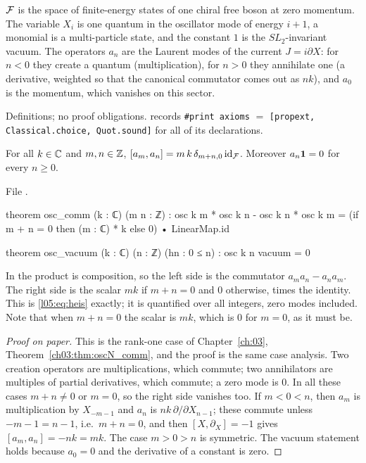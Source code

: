 \begin{physics}
$\mathcal{F}$ is the space of finite-energy states of one chiral free boson at zero momentum. The variable
$X_i$ is one quantum in the oscillator mode of energy $i+1$, a monomial is a multi-particle state, and the
constant $1$ is the $SL_2$-invariant vacuum. The operators $a_n$ are the Laurent modes of the current
$J=i\partial X$: for $n<0$ they create a quantum (multiplication), for $n>0$ they annihilate one (a
derivative, weighted so that the canonical commutator comes out as $nk$), and $a_0$ is the momentum, which
vanishes on this sector.
\end{physics}

\begin{status}
Definitions; no proof obligations.  records
\texttt{\#print axioms} $=$ \texttt{[propext, Classical.choice, Quot.sound]} for all of its declarations.
\end{status}

\begin{theorem}\label{l05:thm:osccomm}
For all $k\in{\mathbb{C}}$ and $m,n\in{\mathbb{Z}}$, $[a_m,a_n]=m\,k\,\delta_{m+n,0}\,\mathrm{id}_{\mathcal{F}}$. Moreover
$a_n\mathbf{1}=0$ for every $n\ge0$.
\end{theorem}

\noindent File .
\begin{leancode}
theorem osc_comm (k : ℂ) (m n : ℤ) :
    osc k m * osc k n - osc k n * osc k m
      = (if m + n = 0 then (m : ℂ) * k else 0) • LinearMap.id

theorem osc_vacuum (k : ℂ) (n : ℤ) (hn : 0 ≤ n) : osc k n vacuum = 0
\end{leancode}

\begin{dictionary}
In  the product \lean{*} is composition, so the left side is the commutator
$a_ma_n-a_na_m$. The right side is the scalar $mk$ if $m+n=0$ and $0$ otherwise, times the identity. This
is \eqref{l05:eq:heis} exactly; it is quantified over all integers, zero modes included. Note that when
$m+n=0$ the scalar is $mk$, which is $0$ for $m=0$, as it must be.
\end{dictionary}

\begin{proof}[Proof on paper]
This is the rank-one case of Chapter~\ref{ch:03}, Theorem~\ref{ch03:thm:oscN_comm}, and the proof is the same
case analysis. Two creation operators are multiplications, which commute; two annihilators are
multiples of partial derivatives, which commute; a zero mode is $0$. In all these cases $m+n\ne0$ or
$m=0$, so the right side vanishes too. If $m<0<n$, then $a_m$ is multiplication by $X_{-m-1}$ and $a_n$ is
$nk\,\partial/\partial X_{n-1}$; these commute unless $-m-1=n-1$, i.e.\ $m+n=0$, and then
$[X,\partial_X]=-1$ gives $[a_m,a_n]=-nk=mk$. The case $m>0>n$ is symmetric. The vacuum statement holds
because $a_0=0$ and the derivative of a constant is zero.
\end{proof}


